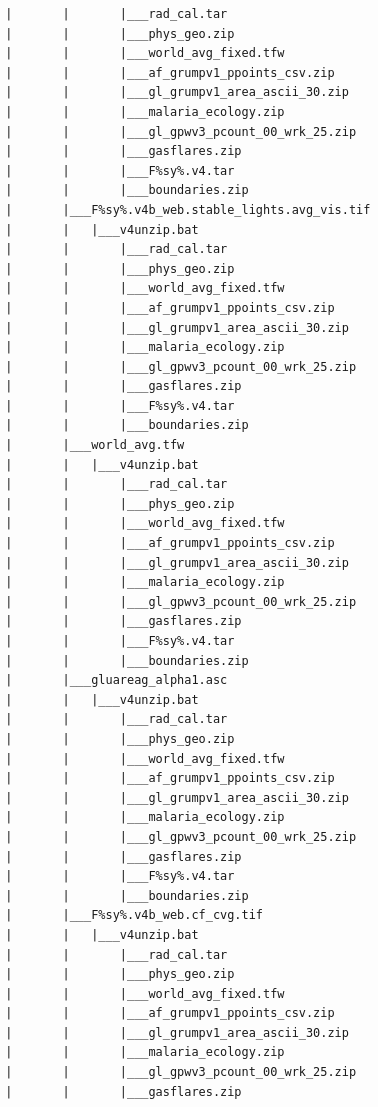 \documentclass[]{book}
\begin{document}
\begin{verbatim}
        |       |       |___rad_cal.tar
        |       |       |___phys_geo.zip
        |       |       |___world_avg_fixed.tfw
        |       |       |___af_grumpv1_ppoints_csv.zip
        |       |       |___gl_grumpv1_area_ascii_30.zip
        |       |       |___malaria_ecology.zip
        |       |       |___gl_gpwv3_pcount_00_wrk_25.zip
        |       |       |___gasflares.zip
        |       |       |___F%sy%.v4.tar
        |       |       |___boundaries.zip
        |       |___F%sy%.v4b_web.stable_lights.avg_vis.tif
        |       |   |___v4unzip.bat
        |       |       |___rad_cal.tar
        |       |       |___phys_geo.zip
        |       |       |___world_avg_fixed.tfw
        |       |       |___af_grumpv1_ppoints_csv.zip
        |       |       |___gl_grumpv1_area_ascii_30.zip
        |       |       |___malaria_ecology.zip
        |       |       |___gl_gpwv3_pcount_00_wrk_25.zip
        |       |       |___gasflares.zip
        |       |       |___F%sy%.v4.tar
        |       |       |___boundaries.zip
        |       |___world_avg.tfw
        |       |   |___v4unzip.bat
        |       |       |___rad_cal.tar
        |       |       |___phys_geo.zip
        |       |       |___world_avg_fixed.tfw
        |       |       |___af_grumpv1_ppoints_csv.zip
        |       |       |___gl_grumpv1_area_ascii_30.zip
        |       |       |___malaria_ecology.zip
        |       |       |___gl_gpwv3_pcount_00_wrk_25.zip
        |       |       |___gasflares.zip
        |       |       |___F%sy%.v4.tar
        |       |       |___boundaries.zip
        |       |___gluareag_alpha1.asc
        |       |   |___v4unzip.bat
        |       |       |___rad_cal.tar
        |       |       |___phys_geo.zip
        |       |       |___world_avg_fixed.tfw
        |       |       |___af_grumpv1_ppoints_csv.zip
        |       |       |___gl_grumpv1_area_ascii_30.zip
        |       |       |___malaria_ecology.zip
        |       |       |___gl_gpwv3_pcount_00_wrk_25.zip
        |       |       |___gasflares.zip
        |       |       |___F%sy%.v4.tar
        |       |       |___boundaries.zip
        |       |___F%sy%.v4b_web.cf_cvg.tif
        |       |   |___v4unzip.bat
        |       |       |___rad_cal.tar
        |       |       |___phys_geo.zip
        |       |       |___world_avg_fixed.tfw
        |       |       |___af_grumpv1_ppoints_csv.zip
        |       |       |___gl_grumpv1_area_ascii_30.zip
        |       |       |___malaria_ecology.zip
        |       |       |___gl_gpwv3_pcount_00_wrk_25.zip
        |       |       |___gasflares.zip

\end{verbatim}
\end{document}
